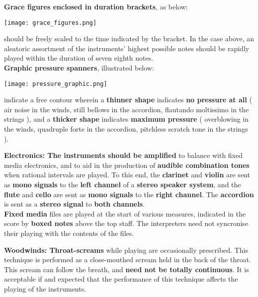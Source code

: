 \documentclass[12pt]{article}
\newcommand*\circled[1]{\tikz[baseline=(char.base)]{
            \node[shape=circle,draw,inner sep=1pt] (char) {#1};}}
\begin{document}
\textbf{\circled{6} Grace figures enclosed in duration brackets}, as below: \\
\begin{center}
\texttt{[image: grace\_figures.png]} \\
\end{center}
should be freely scaled to the time indicated by the bracket. In the case above, an aleatoric assortment of the instruments' highest possible notes should be rapidly played within the duration of seven eighth notes. \\
\textbf{\circled{7} Graphic pressure spanners}, illustrated below:  
\begin{center}
\texttt{[image: pressure\_graphic.png]} \\
\end{center}
indicate a free contour wherein a \textbf{thinner shape} indicates \textbf{no pressure at all} ( air noise in the winds, still bellows in the accordion, flautando moltissimo in the strings ), and a \textbf{thicker shape} indicates \textbf{maximum pressure} ( overblowing in the winds, quadruple forte in the accordion, pitchless scratch tone in the strings ).
\endgroup 


\begingroup
\textbf{Electronics: \circled{1} The instruments should be amplified} to balance with fixed media electronics, and to aid in the production of \textbf{audible combination tones} when rational intervals are played. To this end, the \textbf{clarinet} and \textbf{violin} are sent as \textbf{mono signals} to the \textbf{left channel} of a \textbf{stereo speaker system}, and the \textbf{flute} and \textbf{cello} are sent as \textbf{mono signals} to the \textbf{right channel}. The \textbf{accordion} is sent as a \textbf{stereo signal} to \textbf{both channels}. \\
\textbf{\circled{2} Fixed media} files are played at the start of various measures, indicated in the score by \textbf{boxed notes} above the top staff. The interpreters need not syncronise their playing with the contents of the files. \\
\endgroup 

\begingroup
\textbf{Woodwinds: \circled{1} Throat-screams} while playing are occasionally prescribed. This technique is performed as a close-mouthed scream held in the back of the throat. This scream can follow the breath, and \textbf{need not be totally continuous}. It is acceptable if and expected that the performance of this technique affects the playing of the instruments. 
\endgroup 
\end{document}
